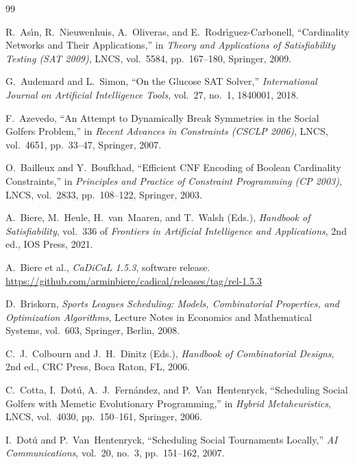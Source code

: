 \documentclass[a4paper,fleqn]{cas-sc}
\begin{document}
\begin{thebibliography}{99}
\small
\setlength{\itemsep}{1pt plus 0.5pt}
\setlength{\parskip}{0pt}

R.~As{\'\i}n, R.~Nieuwenhuis, A.~Oliveras, and E.~Rodr{\'\i}guez-Carbonell,
``Cardinality Networks and Their Applications,''
in \textit{Theory and Applications of Satisfiability Testing (SAT 2009)},
LNCS, vol.~5584, pp.~167--180, Springer, 2009.

G.~Audemard and L.~Simon,
``On the Glucose SAT Solver,''
\textit{International Journal on Artificial Intelligence Tools}, vol.~27, no.~1, 1840001, 2018.

F.~Azevedo,
``An Attempt to Dynamically Break Symmetries in the Social Golfers Problem,''
in \textit{Recent Advances in Constraints (CSCLP 2006)},
LNCS, vol.~4651, pp.~33--47, Springer, 2007.

O.~Bailleux and Y.~Boufkhad,
``Efficient CNF Encoding of Boolean Cardinality Constraints,''
in \textit{Principles and Practice of Constraint Programming (CP 2003)},
LNCS, vol.~2833, pp.~108--122, Springer, 2003.

A.~Biere, M.~Heule, H.~van~Maaren, and T.~Walsh (Eds.),
\textit{Handbook of Satisfiability},
vol.~336 of \textit{Frontiers in Artificial Intelligence and Applications}, 2nd ed., IOS Press, 2021.

A.~Biere et al., \textit{CaDiCaL 1.5.3}, software release.
\url{https://github.com/arminbiere/cadical/releases/tag/rel-1.5.3}

D.~Briskorn,
\textit{Sports Leagues Scheduling: Models, Combinatorial Properties, and Optimization Algorithms},
Lecture Notes in Economics and Mathematical Systems, vol.~603, Springer, Berlin, 2008.

C.~J.~Colbourn and J.~H.~Dinitz (Eds.),
\textit{Handbook of Combinatorial Designs},
2nd ed., CRC Press, Boca Raton, FL, 2006.

C.~Cotta, I.~Dot{\'u}, A.~J.~Fern{\'a}ndez, and P.~Van~Hentenryck,
``Scheduling Social Golfers with Memetic Evolutionary Programming,''
in \textit{Hybrid Metaheuristics}, LNCS, vol.~4030, pp.~150--161, Springer, 2006.

I.~Dot{\'u} and P.~Van~Hentenryck,
``Scheduling Social Tournaments Locally,''
\textit{AI Communications}, vol.~20, no.~3, pp.~151--162, 2007.


\end{thebibliography}
\end{document}
